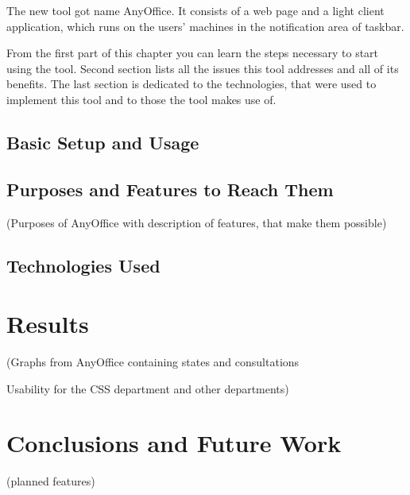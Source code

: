 \documentclass[11pt,singleside]{myfithesis2}
\begin{document}
The new tool got name AnyOffice. It consists of a web page and a light client application, which runs on the users' machines in the notification area of taskbar.

From the first part of this chapter you can learn the steps necessary to start using the tool. Second section lists all the issues this tool addresses and all of its benefits. The last section is dedicated to the technologies, that were used to implement this tool and to those the tool makes use of.


	\section{Basic Setup and Usage}



	\section{Purposes and Features to Reach Them}
(Purposes of AnyOffice with description of features, that make them possible)


	\section{Technologies Used}


\chapter{Results}
(Graphs from AnyOffice containing states and consultations

Usability for the CSS department and other departments)


\chapter{Conclusions and Future Work}

(planned features)



\clearpage
{}
{}

\appendix
\end{document}
